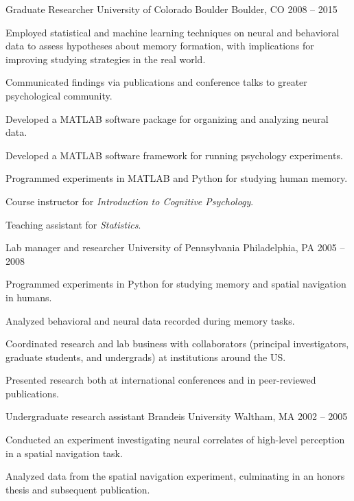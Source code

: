 \begin{cventries}
  \cventry
    {Graduate Researcher} %
    {University of Colorado Boulder} %
    {Boulder, CO} %
    {2008 -- 2015} %
    {
      \begin{cvitems} %
        \item {Employed statistical and machine learning techniques on neural and behavioral data to assess hypotheses about memory formation, with implications for improving studying strategies in the real world.}
        \item {Communicated findings via publications and conference talks to greater psychological community.}
        \item {Developed a MATLAB software package for organizing and analyzing neural data.}
        \item {Developed a MATLAB software framework for running psychology experiments.}
        \item {Programmed experiments in MATLAB and Python for studying human memory.}
        \item {Course instructor for \textit{Introduction to Cognitive Psychology}.}
        \item {Teaching assistant for \textit{Statistics}.}
      \end{cvitems}
    }

  \cventry
    {Lab manager and researcher} %
    {University of Pennsylvania} %
    {Philadelphia, PA} %
    {2005 -- 2008} %
    {
      \begin{cvitems} %
        \item {Programmed experiments in Python for studying memory and spatial navigation in humans.}
        \item {Analyzed behavioral and neural data recorded during memory tasks.}
        \item {Coordinated research and lab business with collaborators (principal investigators, graduate students, and undergrads) at institutions around the US.}
        \item {Presented research both at international conferences and in peer-reviewed publications.}
      \end{cvitems}
    }

  \cventry
    {Undergraduate research assistant} %
    {Brandeis University} %
    {Waltham, MA} %
    {2002 -- 2005} %
    {
      \begin{cvitems} %
        \item {Conducted an experiment investigating neural correlates of high-level perception in a spatial navigation task.}
        \item {Analyzed data from the spatial navigation experiment, culminating in an honors thesis and subsequent publication.}
      \end{cvitems}
    }

\end{cventries}
